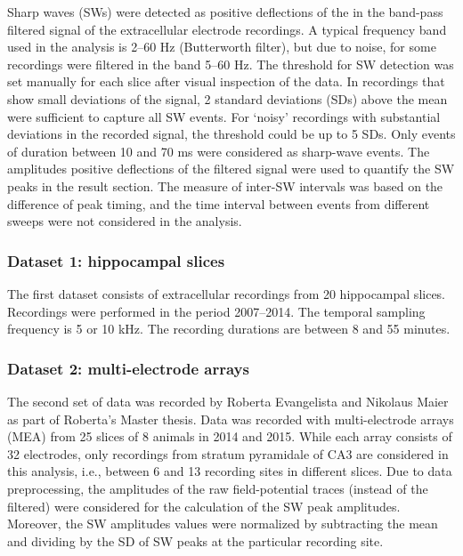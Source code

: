     Sharp waves (SWs) were detected as positive deflections of the in the
    band-pass filtered signal of the extracellular electrode recordings. A
    typical frequency band used in the analysis is 2--60 Hz (Butterworth
    filter), but due to noise, for some recordings were filtered in the band
    5--60 Hz. The threshold for SW detection was set manually for each slice
    after visual inspection of the data. In recordings that show small
    deviations of the signal, 2 standard deviations (SDs) above the mean were
    sufficient to capture all SW events. For `noisy' recordings with
    substantial deviations in the recorded signal, the threshold could be up to
    5 SDs. Only events of duration between 10 and 70 ms were considered as
    sharp-wave events. The amplitudes positive deflections of the filtered
    signal were used to quantify the SW peaks in the result section. The
    measure of inter-SW intervals was based on the difference of peak timing,
    and the time interval between events from different sweeps were not
    considered in the analysis.
 
    \subsubsection{Dataset 1: hippocampal slices}
      The first dataset consists of extracellular recordings from 20 hippocampal
      slices. Recordings were performed in the period 2007--2014. The temporal
      sampling frequency is 5 or 10 kHz. The recording durations are between 8
      and 55 minutes.

    \subsubsection{Dataset 2: multi-electrode arrays}
      The second set of data was recorded by Roberta Evangelista and Nikolaus
      Maier as part of Roberta's Master thesis. Data was recorded with
      multi-electrode arrays (MEA) from 25 slices of 8 animals in 2014 and
      2015. While each array consists of 32 electrodes, only recordings from
      stratum pyramidale of CA3 are considered in this analysis, i.e., between
      6 and 13 recording sites in different slices. Due to data preprocessing,
      the amplitudes of the raw field-potential traces (instead of the
      filtered) were considered for the calculation of the SW peak amplitudes.
      Moreover, the SW amplitudes values were normalized by subtracting the
      mean and dividing by the SD of SW peaks at the particular recording site.

